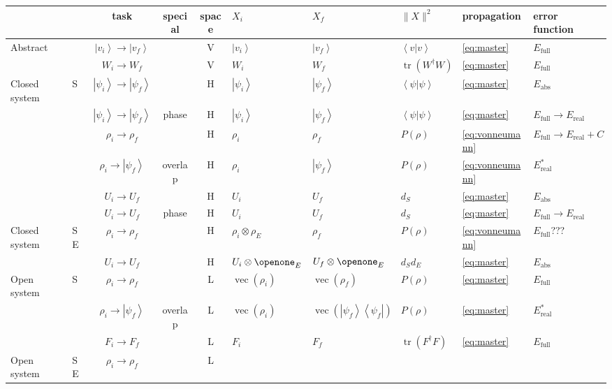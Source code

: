 \documentclass[aps, pra, a4paper, longbibliography, superscriptaddress]{revtex4-1}
\newcommand{\I}{\openone}
\newcommand{\ket}[1]{\left| #1 \right \rangle}
\newcommand{\braket}[2]{\left \langle #1 | #2 \right \rangle}
\newcommand{\ketbra}[2]{\left| #1 \right \rangle \left \langle #2 \right|}
\DeclareMathOperator{\tr}{tr}
\DeclareMathOperator{\cvec}{vec}
\begin{document}
\begin{table}
\begin{tabular}{ll|c|c|c|l|l|l|l|l}
& & task & special & space & $X_i$ & $X_f$ & $\|X\|^2$ & propagation & error function\\
\hline
Abstract &
& $\ket{v_i} \to \ket{v_f}$ && V
& $\ket{v_i}$ &$\ket{v_f}$ & $\braket{v}{v}$ &
\eqref{eq:master} & $E_\text{full}$\\
& & $W_i \to W_f$ && V
& $W_i$ & $W_f$ & $\tr(W^\dagger W)$ &
\eqref{eq:master} & $E_\text{full}$\\
\hline
Closed system & S
& $\ket{\psi_i} \to \ket{\psi_f}$ && H
& $\ket{\psi_i}$ & $\ket{\psi_f}$ & $\braket{\psi}{\psi}$ &
\eqref{eq:master} & $E_\text{abs}$\\
& & $\ket{\psi_i} \to \ket{\psi_f}$ & phase & H
& $\ket{\psi_i}$ & $\ket{\psi_f}$ & $\braket{\psi}{\psi}$ &
\eqref{eq:master} & $E_\text{full} \to E_\text{real}$\\
& & $\rho_i \to \rho_f$ && H
& $\rho_i$ & $\rho_f$ & $P(\rho)$ &
\eqref{eq:vonneumann} & $E_\text{full} \to E_\text{real} + C$\\
& & $\rho_i \to \ket{\psi_f}$ & overlap & H
& $\rho_i$ & $\ket{\psi_f}$ & $P(\rho)$ &
\eqref{eq:vonneumann} & $E_\text{real}^*$\\
& & $U_i \to U_f$ && H
& $U_i$ & $U_f$ & $d_S$ &
\eqref{eq:master} & $E_\text{abs}$\\
& & $U_i \to U_f$ & phase & H
& $U_i$ & $U_f$ & $d_S$ &
\eqref{eq:master} & $E_\text{full} \to E_\text{real}$\\
\hline
Closed system & SE
& $\rho_i \to \rho_f$ && H
& $\rho_i \otimes \rho_E$ & $\rho_f$ & $P(\rho)$ &
\eqref{eq:vonneumann} & $E_\text{full}$???\\
& & $U_i \to U_f$ && H
& $U_i \otimes \I_E$ & $U_f \otimes \I_E$ & $d_S d_E$ &
\eqref{eq:master} & $E_\text{abs}$\\
\hline
Open system & S
& $\rho_i \to \rho_f$ && L & $\cvec(\rho_i)$ & $\cvec(\rho_f)$ & $P(\rho)$ &
\eqref{eq:master} & $E_\text{full}$\\
& & $\rho_i \to \ket{\psi_f}$ & overlap & L
& $\cvec(\rho_i)$ & $\cvec(\ketbra{\psi_f}{\psi_f})$ & $P(\rho)$ &
\eqref{eq:master} & $E_\text{real}^*$\\
& & $F_i \to F_f$ && L & $F_i$ & $F_f$ & $\tr(F^\dagger F)$ &
\eqref{eq:master} & $E_\text{full}$\\
\hline
Open system & SE
& $\rho_i \to \rho_f$ && L

\end{tabular}
\end{table}
\end{document}
